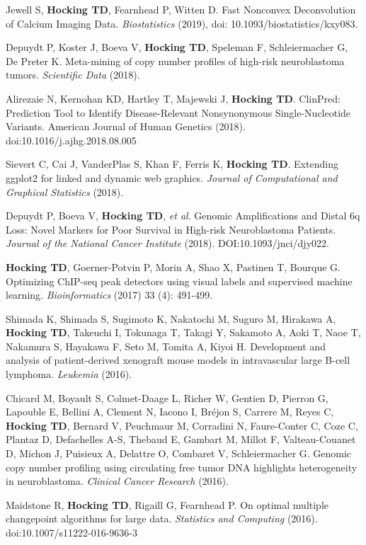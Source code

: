\documentclass[margin,line]{res}
\begin{document}
\begin{resume}
Jewell S, {\bf Hocking TD}, Fearnhead P, Witten D. Fast Nonconvex
Deconvolution of Calcium Imaging Data. {\it Biostatistics} (2019), doi:
10.1093/biostatistics/kxy083.

Depuydt P, Koster J, Boeva V, {\bf Hocking TD}, Speleman F,
Schleiermacher G, De Preter K. Meta-mining of copy number profiles of
high-risk neuroblastoma tumors. {\it Scientific Data} (2018).

Alirezaie N, Kernohan KD, Hartley T, Majewski J, {\bf Hocking
  TD}. ClinPred: Prediction Tool to Identify Disease-Relevant
Nonsynonymous Single-Nucleotide Variants. American Journal of Human
Genetics (2018). doi:10.1016/j.ajhg.2018.08.005

Sievert C, Cai J, VanderPlas S, Khan F, Ferris K, {\bf Hocking
  TD}. Extending ggplot2 for linked and dynamic web graphics. {\it
  Journal of Computational and Graphical Statistics} (2018).

Depuydt P, Boeva V, {\bf Hocking TD}, {\it et al}. Genomic
Amplifications and Distal 6q Loss: Novel Markers for Poor Survival in
High-risk Neuroblastoma Patients. {\it Journal of the National Cancer
  Institute} (2018). DOI:10.1093/jnci/djy022.

{\bf Hocking TD}, Goerner-Potvin P, Morin A, Shao X, Pastinen T,
Bourque G. Optimizing ChIP-seq peak detectors using visual labels and
supervised machine learning. {\it Bioinformatics} (2017) 33 (4): 491-499.

Shimada K, Shimada S, Sugimoto K, Nakatochi M, Suguro M, Hirakawa A,
{\bf Hocking TD}, Takeuchi I, Tokunaga T, Takagi Y, Sakamoto A, Aoki T, Naoe
T, Nakamura S, Hayakawa F, Seto M, Tomita A, Kiyoi H. Development and
analysis of patient-derived xenograft mouse models in intravascular
large B-cell lymphoma. {\it Leukemia} (2016).

Chicard M, Boyault S, Colmet-Daage L, Richer W, Gentien D, Pierron G,
Lapouble E, Bellini A, Clement N, Iacono I, Bréjon S, Carrere M, Reyes
C, {\bf Hocking TD}, Bernard V, Peuchmaur M, Corradini N, Faure-Conter
C, Coze C, Plantaz D, Defachelles A-S, Thebaud E, Gambart M, Millot F,
Valteau-Couanet D, Michon J, Puisieux A, Delattre O, Combaret V,
Schleiermacher G. Genomic copy number profiling using circulating free
tumor DNA highlights heterogeneity in neuroblastoma. {\it Clinical Cancer
Research} (2016).

Maidstone R, {\bf Hocking TD}, Rigaill G, Fearnhead P. On optimal
multiple changepoint algorithms for large data. {\it Statistics and
Computing} (2016). doi:10.1007/s11222-016-9636-3 


\end{resume}
\end{document}
